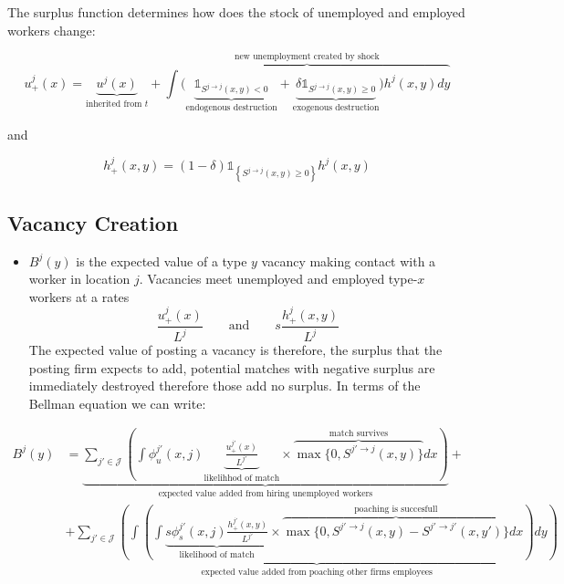 \documentclass[
  letterpaper,
  DIV=11,
  numbers=noendperiod]{scrreprt}
\providecommand{\tightlist}{%
  \setlength{\itemsep}{0pt}\setlength{\parskip}{0pt}}\usepackage{longtable,booktabs,array}
\begin{document}
The surplus function determines how does the stock of unemployed and
employed workers change:

\begin{equation}\label{eq-unemp-interim}
u^{j}_{+}(x) = \underbrace{u^j(x)}_{\text{inherited from }t} + \overbrace{\int \Big(\underbrace{\mathbb{1}_{S^{j \to j}(x,y)<0}}_{\text{endogenous destruction}} + \underbrace{\delta\mathbb{1}_{S^{j \to j}(x,y)\geq0}}_{\text{exogenous destruction}}\Big)h^j(x,y)dy}^{\text{new unemployment created by shock}}
\end{equation}

and

\begin{equation}\label{eq-matches-interim}
h_{+}^{j}(x,y) = (1-\delta)\mathbb{1}_{\left\{S^{j \to j}(x,y)\geq 0\right\}}h^j(x,y)
\end{equation}

\hypertarget{vacancy-creation}{%
\subsection{Vacancy Creation}\label{vacancy-creation}}

\begin{itemize}
\tightlist
\item
  \(B^j(y)\) is the expected value of a type \(y\) vacancy making
  contact with a worker in location \(j\). Vacancies meet unemployed and
  employed type-\(x\) workers at a rates
  \[\frac{u_{+}^j(x)}{L^j} \qquad \text{and} \qquad s\frac{h_{+}^j(x,y)}{L^j}\]
  The expected value of posting a vacancy is therefore, the surplus that
  the posting firm expects to add, potential matches with negative
  surplus are immediately destroyed therefore those add no surplus. In
  terms of the Bellman equation we can write:
\end{itemize}

\begin{align}
B^j(y) &= \underbrace{\sum_{j'\in \mathcal{J}}\left( \int\phi_u^{j'}(x,j)\underbrace{\frac{u_{+}^{j'}(x)}{L^{j'}}}_{\text{likelihhod of match}}\times\overbrace{ \max\{0, S^{j'\to j}(x,y)\} }^{\text{match survives}}dx\right)}_{\text{expected value added from hiring unemployed workers}} + \nonumber \\
& +\underbrace{\sum_{j'\in \mathcal{J}}\left(\int \left(\int\underbrace{s\phi_s^{j'}(x,j)\frac{h_{+}^{j'}(x,y)}{L^{j'}}}_{\text{likelihood of match}}\times \overbrace{ \max\{0, S^{j' \to j}(x,y)-S^{j' \to j'}(x,y')\}}^{\text{poaching is succesfull}}dx\right)dy\right)}_{\text{expected value added from poaching other firms employees}}
\end{align}
\end{document}
